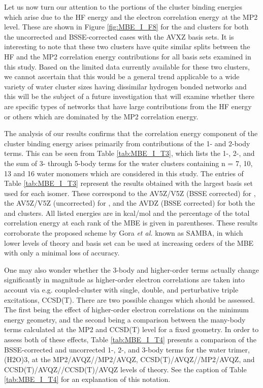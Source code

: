 \documentclass[11pt, proquest]{uwthesis}[2020/02/24]
\let\ce\ch
\begin{document}
\par Let us now turn our attention to the portions of the cluster binding energies which arise due to the HF energy and the electron correlation energy at the MP2 level. These are shown in Figure \ref{fig:MBE_I_F8} for the \ce{(H2O)7} and \ce{(H2O)_{10}} clusters for both the uncorrected and BSSE-corrected cases with the AVXZ basis sets. It is interesting to note that these two clusters have quite similar splits between the HF and the MP2 correlation energy contributions for all basis sets examined in this study. Based on the limited data currently available for these two clusters, we cannot ascertain that this would be a general trend applicable to a wide variety of water cluster sizes having dissimilar hydrogen bonded networks and this will be the subject of a future investigation that will examine whether there are specific types of networks that have large contributions from the HF energy or others which are dominated by the MP2 correlation energy.

\par The analysis of our results confirms that the correlation energy component of the cluster binding energy arises primarily from contributions of the 1- and 2-body terms. This can be seen from Table \ref{tab:MBE_I_T3}, which lists the 1-, 2-, and the sum of 3- through 5-body terms for the water clusters containing n = 7, 10, 13 and 16 water monomers which are considered in this study. The entries of Table \ref{tab:MBE_I_T3} represent the results obtained with the largest basis set used for each isomer. These correspond to the AV5Z/V5Z (BSSE corrected) for \ce{(H2O)7}, the AV5Z/V5Z (uncorrected) for \ce{(H2O)_{10}}, and the AVDZ (BSSE corrected) for both the \ce{(H2O)_{13}} and \ce{(H2O)_{16}} clusters. All listed energies are in kcal/mol and the percentage of the total correlation energy at each rank of the MBE is given in parentheses. These results corroborate the proposed scheme by Gora \textit{et al.} known as SAMBA,\autocite{gora_interaction_2011} in which lower levels of theory and basis set can be used at increasing orders of the MBE with only a minimal loss of accuracy.

\par One may also wonder whether the 3-body and higher-order terms actually change significantly in magnitude as higher-order electron correlations are taken into account via e.g. coupled-cluster with single, double, and perturbative triple excitations, CCSD(T). There are two possible changes which should be assessed. The first being the effect of higher-order electron correlations on the minimum energy geometry, and the second being a comparison between the many-body terms calculated at the MP2 and CCSD(T) level for a fixed geometry. In order to assess both of these effects, Table \ref{tab:MBE_I_T4} presents a comparison of the BSSE-corrected and uncorrected 1-, 2-, and 3-body terms for the water trimer, (H2O)3, at the MP2/AVQZ//MP2/AVQZ, CCSD(T)/AVQZ//MP2/AVQZ, and CCSD(T)/AVQZ//CCSD(T)/AVQZ levels of theory. See the caption of Table \ref{tab:MBE_I_T4} for an explanation of this notation.
\end{document}
